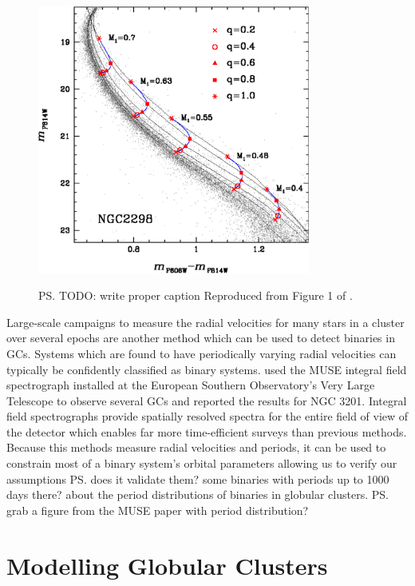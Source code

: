 \begin{figure}
	\centering
	\includegraphics[width=0.8\textwidth]{"./figures/main_sequence_binaries.pdf"}
	\label{fig:1/main_sequence_binaries}
\caption{\ps{TODO: write proper caption} Reproduced from Figure 1 of \citet{Milone2012}.}
\end{figure}


Large-scale campaigns to measure the radial velocities for many stars in a cluster over several
epochs are another method which can be used to detect binaries in GCs. Systems which are found to
have periodically varying radial velocities can typically be confidently classified as binary
systems. \citet{Giesers2019} used the MUSE integral field spectrograph installed at the European
Southern Observatory's Very Large Telescope to observe several GCs and reported the results for NGC
3201. Integral field spectrographs provide spatially resolved spectra for the entire field of view
of the detector which enables far more time-efficient surveys than previous methods. Because this
methods measure radial velocities and periods, it can be used to constrain most of a binary system's
orbital parameters allowing us to verify our assumptions \ps{does it validate them? some binaries
	with periods up to 1000 days there?} about the period distributions of binaries in globular
clusters. \ps{grab a figure from the MUSE paper with period distribution?}



\section{Modelling Globular Clusters}

